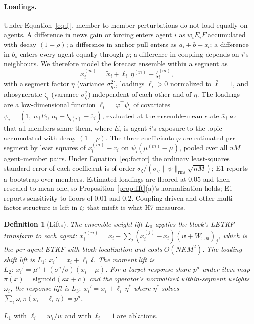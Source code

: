 \documentclass[10pt]{article}
\newtheorem{definition}{Definition}
\theoremstyle{remark}
\begin{document}
\paragraph{Loadings.} Under Equation~\eqref{eq:fj}, member-to-member perturbations do not load equally on agents. A difference in news gain or forcing enters agent $i$ as $w_iE_iF$ accumulated with decay $(1-\rho)$; a difference in anchor pull enters as $a_i+b-x_i$; a difference in $b_s$ enters every agent equally through $\rho$; a difference in coupling depends on $i$'s neighbours. We therefore model the forecast ensemble within a segment as
\begin{equation}
x_i^{(m)} = \tilde x_i + \ell_i\,\eta^{(m)} + \zeta_i^{(m)},
\label{eq:factor}
\end{equation}
with a segment factor $\eta$ (variance $\sigma_\eta^2$), loadings $\ell_i>0$ normalized to $\bar\ell=1$, and idiosyncratic $\zeta_i$ (variance $\sigma_\zeta^2$) independent of each other and of $\eta$. The loadings are a low-dimensional function $\ell_i=\varphi^\top \psi_i$ of covariates $\psi_i=(1,\ w_i\tilde E_{i},\ a_i+b_{g(i)}-\bar x_i)$, evaluated at the ensemble-mean state $\bar x_i$ so that all members share them, where $\tilde E_i$ is agent $i$'s exposure to the topic accumulated with decay $(1-\rho)$. The three coefficients $\varphi$ are estimated per segment by least squares of $x_i^{(m)}-\bar x_i$ on $\psi_i(\mu^{(m)}-\bar\mu)$, pooled over all $nM$ agent--member pairs. Under Equation~\eqref{eq:factor} the ordinary least-squares standard error of each coefficient is of order $\sigma_\zeta/(\sigma_\eta\,\|\psi\|_{\mathrm{rms}}\sqrt{nM})$; E1 reports a bootstrap over members. Estimated loadings are floored at $0.05$ and then rescaled to mean one, so Proposition~\ref{prop:lift}(a)'s normalization holds; E1 reports sensitivity to floors of $0.01$ and $0.2$. Coupling-driven and other multi-factor structure is left in $\zeta$; that misfit is what H7 measures.

\begin{definition}[Lifts]
The \emph{ensemble-weight lift} $L_0$ applies the block's LETKF transform to each agent: $x_i^{a(m)}=\bar x_i+\sum_j (x_i^{(j)}-\bar x_i)(\bar w + W_{:,m})_j$, which is the per-agent ETKF with block localization and costs $O(NKM^2)$. The \emph{loading-shift lift} is $L_1:\ x_i' = x_i + \ell_i\,\delta$. The \emph{moment lift} is $L_2:\ x_i' = \mu^a + (\sigma^a/\sigma)(x_i-\mu)$. For a target response share $p^a$ under item map $\pi(x)=\mathrm{sigmoid}(\kappa x+c)$ and the operator's normalized within-segment weights $\omega_i$, the \emph{response lift} is $L_3:\ x_i' = x_i + \ell_i\,\eta^\ast$ where $\eta^\ast$ solves $\sum_i \omega_i\,\pi(x_i+\ell_i\eta)=p^a$.
\end{definition}
$L_1$ with $\ell_i=w_i/\bar w$ and with $\ell_i=1$ are ablations.
\end{document}
